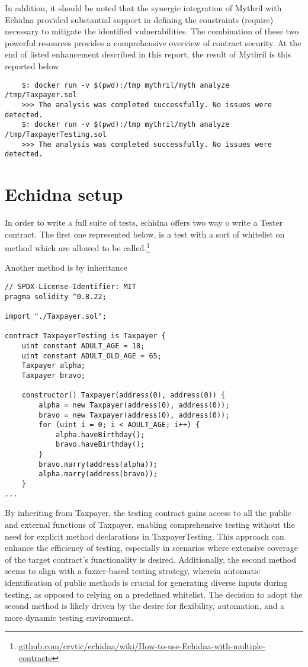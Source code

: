 \documentclass{article}
\begin{document}
In addition, it should be noted that the synergic integration of Mythril with Echidna provided substantial support in defining the constraints (require) necessary to mitigate the identified vulnerabilities. The combination of these two powerful resources provides a comprehensive overview of contract security.
At the end of listed enhancement described in this report, the result of Mythril is this reported below
\begin{verbatim}
    $: docker run -v $(pwd):/tmp mythril/myth analyze /tmp/Taxpayer.sol
    >>> The analysis was completed successfully. No issues were detected.
    $: docker run -v $(pwd):/tmp mythril/myth analyze /tmp/TaxpayerTesting.sol
    >>> The analysis was completed successfully. No issues were detected.
\end{verbatim}

\section{Echidna setup}
In order to write a full suite of tests, echidna offers two way o write a Tester contract. The first one represented below, is a test with a sort of whitelist on method which are allowed to be called.\footnote{\href{https://github.com/crytic/echidna/wiki/How-to-use-Echidna-with-multiple-contracts}{github.com/crytic/echidna/wiki/How-to-use-Echidna-with-multiple-contracts}}

Another method is by inheritance
\begin{verbatim}
// SPDX-License-Identifier: MIT
pragma solidity ^0.8.22;

import "./Taxpayer.sol"; 

contract TaxpayerTesting is Taxpayer {
    uint constant ADULT_AGE = 18;
    uint constant ADULT_OLD_AGE = 65;
    Taxpayer alpha;
    Taxpayer bravo;

    constructor() Taxpayer(address(0), address(0)) {
        alpha = new Taxpayer(address(0), address(0));
        bravo = new Taxpayer(address(0), address(0));
        for (uint i = 0; i < ADULT_AGE; i++) {
            alpha.haveBirthday();
            bravo.haveBirthday();
        }
        bravo.marry(address(alpha));
        alpha.marry(address(bravo));
    }
...
\end{verbatim}
By inheriting from Taxpayer, the testing contract gains access to all the public and external functions of Taxpayer, enabling comprehensive testing without the need for explicit method declarations in TaxpayerTesting. This approach can enhance the efficiency of testing, especially in scenarios where extensive coverage of the target contract's functionality is desired. Additionally, the second method seems to align with a fuzzer-based testing strategy, wherein automatic identification of public methods is crucial for generating diverse inputs during testing, as opposed to relying on a predefined whitelist. The decision to adopt the second method is likely driven by the desire for flexibility, automation, and a more dynamic testing environment.
\end{document}
